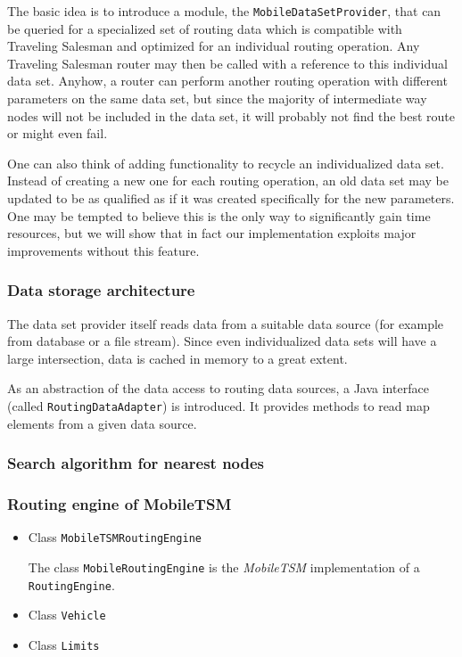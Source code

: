 The basic idea is to introduce a module, the \texttt{MobileDataSetProvider}, that can be queried for a specialized set of routing data which is compatible with Traveling Salesman and optimized for an individual routing operation. Any Traveling Salesman router may then be called with a reference to this individual data set. Anyhow, a router can perform another routing operation with different parameters on the same data set, but since the majority of intermediate way nodes will not be included in the data set, it will probably not find the best route or might even fail.\newline

One can also think of adding functionality to recycle an individualized data set. Instead of creating a new one for each routing operation, an old data set may be updated to be as qualified as if it was created specifically for the new parameters. One may be tempted to believe this is the only way to significantly gain time resources, but we will show that in fact our implementation exploits major improvements without this feature.

\subsubsection{Data storage architecture}

The data set provider itself reads data from a suitable data source (for example from database or a file stream). Since even individualized data sets will have a large intersection, data is cached in memory to a great extent.\newline

As an abstraction of the data access to routing data sources, a Java interface (called \texttt{RoutingDataAdapter}) is introduced. It provides methods to read map elements from a given data source.


\subsubsection{Search algorithm for nearest nodes}


\subsubsection{Routing engine of MobileTSM}

\begin{itemize}
		
	\item Class \texttt{MobileTSMRoutingEngine}
	
		The class \texttt{MobileRoutingEngine} is the \emph{MobileTSM} implementation of a \texttt{RoutingEngine}.
		
	\item Class \texttt{Vehicle}
		
	\item Class \texttt{Limits}

\end{itemize}
